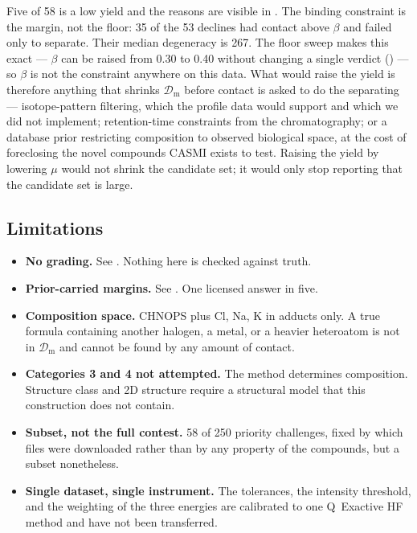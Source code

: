 \documentclass[11pt,twocolumn,a4paper]{article}
\theoremstyle{definition}
\theoremstyle{remark}
\newcommand{\Dmass}{\mathcal{D}_{\mathrm{m}}}
\begin{document}
Five of 58 is a low yield and the reasons are visible in . The
binding constraint is the margin, not the floor: 35 of the 53 declines had contact
above $\beta$ and failed only to separate. Their median degeneracy is 267. The
floor sweep makes this exact --- $\beta$ can be raised from 0.30 to 0.40 without
changing a single verdict () --- so $\beta$ is not the
constraint anywhere on this data. What
would raise the yield is therefore anything that shrinks $\Dmass$ before contact
is asked to do the separating --- isotope-pattern filtering, which the profile
data would support and which we did not implement; retention-time constraints from
the chromatography; or a database prior restricting composition to observed
biological space, at the cost of foreclosing the novel compounds CASMI exists to
test. Raising the yield by lowering $\mu$ would not shrink the candidate set; it
would only stop reporting that the candidate set is large.

\subsection{Limitations}

\begin{itemize}[leftmargin=1.4em]
\item \textbf{No grading.} See . Nothing here is checked
against truth.
\item \textbf{Prior-carried margins.} See . One licensed
answer in five.
\item \textbf{Composition space.} CHNOPS plus Cl, Na, K in adducts only. A true
formula containing another halogen, a metal, or a heavier heteroatom is not in
$\Dmass$ and cannot be found by any amount of contact.
\item \textbf{Categories 3 and 4 not attempted.} The method determines
composition. Structure class and 2D structure require a structural model that this
construction does not contain.
\item \textbf{Subset, not the full contest.} 58 of 250 priority challenges, fixed
by which files were downloaded rather than by any property of the compounds, but a
subset nonetheless.
\item \textbf{Single dataset, single instrument.} The tolerances, the intensity
threshold, and the weighting of the three energies are calibrated to one Q~Exactive
HF method and have not been transferred.
\end{itemize}
\end{document}
